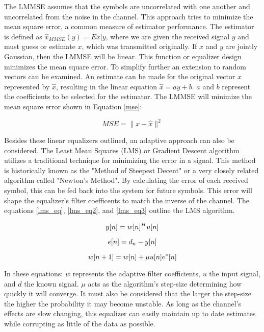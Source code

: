 The LMMSE assumes that the symbols are uncorrelated with one another and uncorrelated from the noise in the channel.  This approach tries to minimize the mean square error, a common measure of estimator performance.  The estimator is defined as \(\hat{x}_{MMSE}(y)=E{x|y}\), where we are given the received signal \(y\) and must guess or estimate \(x\), which was transmitted originally.  If \(x\) and \(y\) are jointly Gaussian, then the LMMSE will be linear.  This function or equalizer design minimizes the mean square error.  To simplify further an extension to random vectors can be examined.  An estimate can be made for the original vector \(x\) represented by \(\hat{x}\), resulting in the linear equation \(\hat{x}=ay+b\).  \(a\) and \(b\) represent the coefficients to be selected for the estimator.  The LMMSE will minimize the mean square error shown in Equation \ref{mse}:

\begin{equation}\label{mse}
 MSE = \|x-\hat{x}\|^{2}
\end{equation}

Besides these linear equalizers outlined, an adaptive approach can also be considered.  The Least Mean Squares (LMS) or Gradient Descent algorithm utilizes a traditional technique for minimizing the error in a signal.  This method is historically known as the "Method of Steepest Decent" or a very closely related algorithm called "Newton's Method". By calculating the error of each received symbol, this can be fed back into the system for future symbols.  This error will shape the equalizer's filter coefficents to match the inverse of the channel.  The equations \ref{lms_eq}, \ref{lms_eq2}, and \ref{lms_eq3} outline the LMS algorithm.

\begin{equation}\label{lms_eq}
y[n]=w[n]^{H}u[n]\\
\end{equation}

\begin{equation}\label{lms_eq2}
e[n]=d_{n}-y[n]\\
\end{equation}

\begin{equation}\label{lms_eq3}
w[n+1]=w[n]+\mu u[n]e^{*}[n]\\ 
\end{equation}

In these equations: \(w\) represents the adaptive filter coefficients, \(u\) the input signal, and \(d\) the known signal.  \(\mu\) acts as the algorithm's step-size determining how quickly it will converge.  It must also be considered that the larger the step-size the higher the probability it may become unstable.  As long as the channel's effects are slow changing, this equalizer can easily maintain up to date estimates while corrupting as little of the data as possible.\\  

